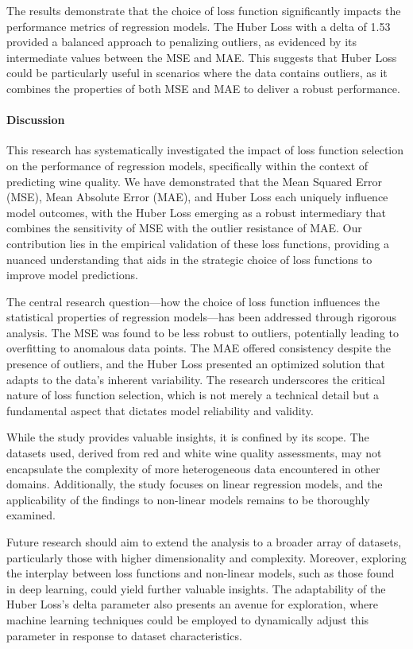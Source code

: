 \documentclass[12pt]{article}
\begin{document}
The results demonstrate that the choice of loss function significantly impacts the performance metrics of regression models. The Huber Loss with a delta of 1.53 provided a balanced approach to penalizing outliers, as evidenced by its intermediate values between the MSE and MAE. This suggests that Huber Loss could be particularly useful in scenarios where the data contains outliers, as it combines the properties of both MSE and MAE to deliver a robust performance.


\paragraph{Discussion}

This research has systematically investigated the impact of loss function selection on the performance of regression models, specifically within the context of predicting wine quality. We have demonstrated that the Mean Squared Error (MSE), Mean Absolute Error (MAE), and Huber Loss each uniquely influence model outcomes, with the Huber Loss emerging as a robust intermediary that combines the sensitivity of MSE with the outlier resistance of MAE. Our contribution lies in the empirical validation of these loss functions, providing a nuanced understanding that aids in the strategic choice of loss functions to improve model predictions.


The central research question—how the choice of loss function influences the statistical properties of regression models—has been addressed through rigorous analysis. The MSE was found to be less robust to outliers, potentially leading to overfitting to anomalous data points. The MAE offered consistency despite the presence of outliers, and the Huber Loss presented an optimized solution that adapts to the data's inherent variability. The research underscores the critical nature of loss function selection, which is not merely a technical detail but a fundamental aspect that dictates model reliability and validity.


While the study provides valuable insights, it is confined by its scope. The datasets used, derived from red and white wine quality assessments, may not encapsulate the complexity of more heterogeneous data encountered in other domains. Additionally, the study focuses on linear regression models, and the applicability of the findings to non-linear models remains to be thoroughly examined.


Future research should aim to extend the analysis to a broader array of datasets, particularly those with higher dimensionality and complexity. Moreover, exploring the interplay between loss functions and non-linear models, such as those found in deep learning, could yield further valuable insights. The adaptability of the Huber Loss's delta parameter also presents an avenue for exploration, where machine learning techniques could be employed to dynamically adjust this parameter in response to dataset characteristics.




\end{document}
